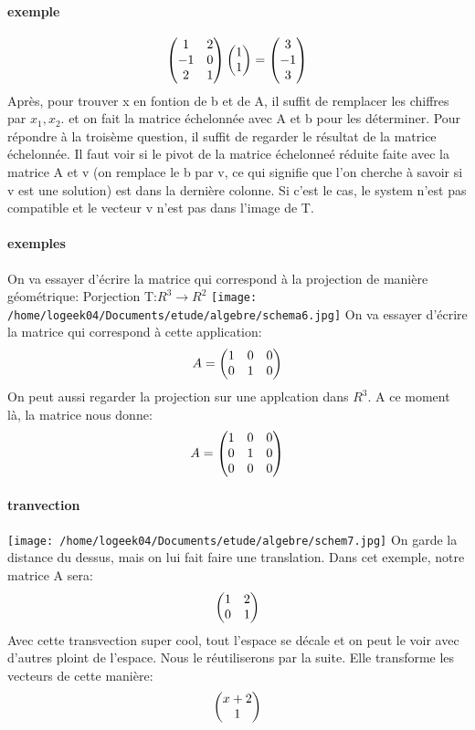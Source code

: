 \documentclass[a4paper,10pt]{article}
\begin{document}
\paragraph{exemple}
\[
\begin{pmatrix}
1&2\cr
-1&0\cr
2&1\cr
\end{pmatrix}
\begin{pmatrix}
1\cr
1\cr
\end{pmatrix}
=\begin{pmatrix}
3\cr
-1\cr
3\cr
\end{pmatrix}
\]
Après, pour trouver x en fontion de b et de A, il suffit de remplacer les chiffres par $x_1,x_2$. et on fait la matrice échelonnée avec A et b pour les déterminer.
 Pour répondre à la troisème question, il suffit de regarder le résultat de la matrice échelonnée. 
\newline
Il faut voir si le pivot de la matrice échelonneé réduite faite avec la matrice A et v (on remplace le b par v, ce qui signifie que l'on cherche à savoir si v est une solution) est dans la dernière colonne. Si c'est le cas, le system n'est pas compatible et le vecteur v n'est pas dans l'image de T. 
\newline
\paragraph{exemples}
On va essayer d'écrire la matrice qui correspond à la projection de manière géométrique:
\newline
Porjection T:$R^3\rightarrow R^2$
\texttt{[image: /home/logeek04/Documents/etude/algebre/schema6.jpg]}
\newline
On va essayer d'écrire la matrice qui correspond à cette application:
\newline
\[
A=\begin{pmatrix}
1&0&0\cr
0&1&0\cr
\end{pmatrix}
\]
\newline
On peut aussi regarder la projection sur une applcation dans $R^3$. A ce moment là, la matrice nous donne:
\newline
\[
A=\begin{pmatrix}
1&0&0\cr
0&1&0\cr
0&0&0\cr
\end{pmatrix}
\]
\newline
\paragraph{tranvection}
\texttt{[image: /home/logeek04/Documents/etude/algebre/schem7.jpg]}
On garde la distance du dessus, mais on lui fait faire une translation.
\newline
Dans cet exemple, notre matrice A sera:
\[
\begin{pmatrix}
1&2\cr
0&1\cr
\end{pmatrix}
\]
\newline
Avec cette transvection super cool, tout l'espace se décale et on peut le voir avec d'autres ploint de l'espace. Nous le réutiliserons par la suite.
Elle transforme les vecteurs de cette manière:
\[
\begin{pmatrix}
x+2\cr
1\cr
\end{pmatrix}
\]
\end{document}
